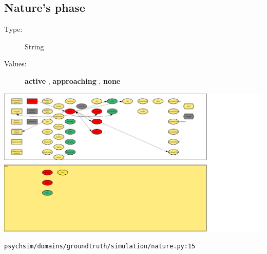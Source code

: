 \documentclass{article}%
\begin{document}
%
\subsection{Nature's phase}%
\label{subsec:Nature's phase}%
\begin{description}%
\item[Type:]%
String%
\item[Values:]%
\textbf{active}%
, %
\textbf{approaching}%
, %
\textbf{none}%
\end{description}%
\includegraphics[width=\textwidth]{images/phaseOfNature.png}%
\begin{flushleft}%
\verb|psychsim/domains/groundtruth/simulation/nature.py:15|%
\end{flushleft}%
\end{document}
